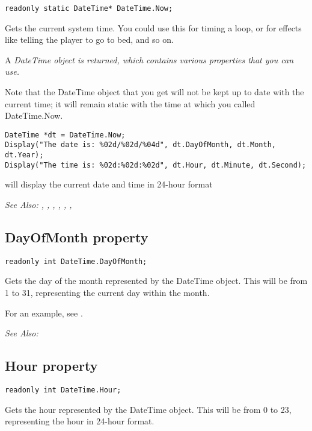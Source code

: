 \begin{verbatim}
readonly static DateTime* DateTime.Now;
\end{verbatim}
Gets the current system time.
You could use this for timing a loop, or for effects like telling the
player to go to bed, and so on.

A \it{DateTime} object is returned, which contains various properties that you can use.

Note that the DateTime object that you get will not be kept up to date with the current time;
it will remain static with the time at which you called DateTime.Now.

\begin{verbatim}
DateTime *dt = DateTime.Now;
Display("The date is: %02d/%02d/%04d", dt.DayOfMonth, dt.Month, dt.Year);
Display("The time is: %02d:%02d:%02d", dt.Hour, dt.Minute, dt.Second);
\end{verbatim}
will display the current date and time in 24-hour format

\it{See Also:} ,
,
,
,
,
,


\subsection{DayOfMonth property}\label{DateTime.DayOfMonth}%

\begin{verbatim}
readonly int DateTime.DayOfMonth;
\end{verbatim}
Gets the day of the month represented by the DateTime object. This will be from 1 to 31,
representing the current day within the month.

For an example, see .

\it{See Also:} 


\subsection{Hour property}\label{DateTime.Hour}%

\begin{verbatim}
readonly int DateTime.Hour;
\end{verbatim}
Gets the hour represented by the DateTime object. This will be from 0 to 23,
representing the hour in 24-hour format.


